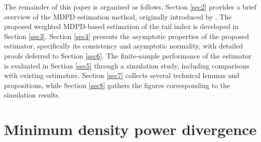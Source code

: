 \documentclass[12pt,reqno,openbib,runningheads,a4paper,portrait]{amsart}%
\begin{document}
\noindent The remainder of this paper is organized as follows. Section
\ref{sec2} provides a brief overview of the MDPD estimation method, originally
introduced by \cite{Basu98}. The proposed weighted MDPD-based estimation of
the tail index is developed in Section \ref{sec3}. Section \ref{sec4} presents
the asymptotic properties of the proposed estimator, specifically its
consistency and asymptotic normality, with detailed proofs deferred to Section
\ref{sec6}. The finite-sample performance of the estimator is evaluated in
Section \ref{sec5} through a simulation study, including comparisons with
existing estimators. Section \ref{sec7} collects several technical lemmas and
propositions, while Section \ref{sec8} gathers the figures corresponding to
the simulation results.

\newpage

\section{\textbf{Minimum density power divergence\label{sec2}}}
\end{document}
